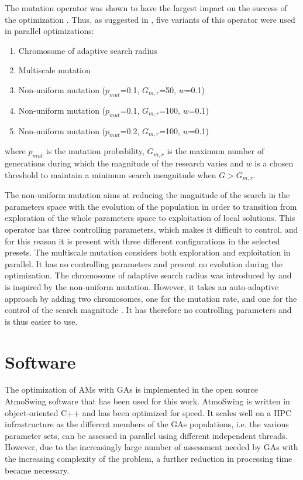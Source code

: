 \documentclass[draft]{agujournal2019}
\begin{document}
The mutation operator was shown to have the largest impact on the success of the optimization . Thus, as suggested in , five variants of this operator were used in parallel optimizations: 

\begin{enumerate}
	\item Chromosome of adaptive search radius
	\item Multiscale mutation
	\item Non-uniform mutation ($p_{mut}$=0.1, $G_{m,r}$=50, $w$=0.1)
	\item Non-uniform mutation ($p_{mut}$=0.1, $G_{m,r}$=100, $w$=0.1)
	\item Non-uniform mutation ($p_{mut}$=0.2, $G_{m,r}$=100, $w$=0.1)
\end{enumerate}

where $p_{mut}$ is the mutation probability, $G_{m,r}$ is the maximum number of generations
during which the magnitude of the research varies and $w$ is a chosen threshold to maintain a minimum search meagnitude when $G>G_{m,r}$.

The non-uniform mutation \cite{Michalewicz1996} aims at reducing the magnitude of the search in the parameters space with the evolution of the population in order to transition from exploration of the whole parameters space to exploitation of local solutions. This operator has three controlling parameters, which makes it difficult to control, and for this reason it is present with three different configurations in the selected presets. The multiscale mutation considers both exploration and exploitation in parallel. It has no controlling parameters and present no evolution during the optimization. The chromosome of adaptive search radius was introduced by  and is inspired by the non-uniform mutation. However, it takes an auto-adaptive approach by adding two chromosomes, one for the mutation rate, and one for the control of the search magnitude \cite<see details in>{Horton2017a}. It has therefore no controlling parameters and is thus easier to use. 


\section{Software}
\label{software}

The optimization of AMs with GAs is implemented in the open source AtmoSwing software \cite{Horton2019} that has been used for this work. AtmoSwing is written in object-oriented C++ and has been optimized for speed. It scales well on a HPC infrastructure as the different members of the GAs populations, i.e. the various parameter sets, can be assessed in parallel using different independent threads. However, due to the increasingly large number of assessment needed by GAs with the increasing complexity of the problem, a further reduction in processing time became necessary. 
\end{document}
